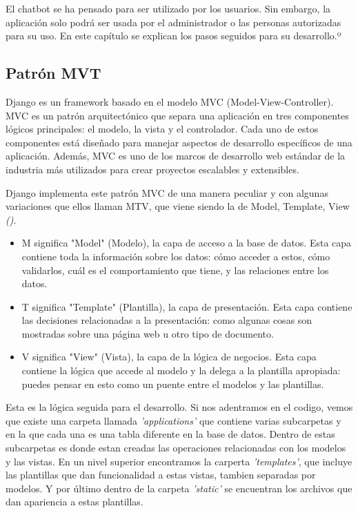 El chatbot se ha pensado para ser utilizado por los usuarios. Sin embargo, la aplicación solo podrá ser usada por el administrador o las personas autorizadas para su uso. En este capítulo se explican los pasos seguidos para su desarrollo.º

\subsection{Patrón MVT}

Django es un framework basado en el modelo  MVC (Model-View-Controller). MVC es un patrón arquitectónico que separa una aplicación en tres componentes lógicos principales: el modelo, la vista y el controlador. Cada uno de estos componentes está diseñado para manejar aspectos de desarrollo específicos de una aplicación. Además, MVC es uno de los marcos de desarrollo web estándar de la industria más utilizados para crear proyectos escalables y extensibles.

Django implementa este patrón MVC de una manera peculiar y con algunas variaciones que ellos llaman MTV, que viene siendo la de Model, Template, View \textit{(\cite{djangomvt})}.

\begin{itemize}

\item M significa "Model" (Modelo), la capa de acceso a la base de datos. Esta capa contiene toda la información sobre los datos: cómo acceder a estos, cómo validarlos, cuál es el comportamiento que tiene, y las relaciones entre los datos.

\item T significa "Template" (Plantilla), la capa de presentación. Esta capa contiene las decisiones relacionadas a la presentación: como algunas cosas son mostradas sobre una página web u otro tipo de documento.

\item V significa "View" (Vista), la capa de la lógica de negocios. Esta capa contiene la lógica que accede al modelo y la delega a la plantilla apropiada: puedes pensar en esto como un puente entre el modelos y las plantillas.

\end{itemize}

Esta es la lógica seguida para el desarrollo. Si nos adentramos en el codigo, vemos que existe una carpeta llamada \textit{'applications'} que contiene varias subcarpetas y en la que cada una es una tabla diferente en la base de datos. Dentro de estas subcarpetas es donde estan creadas las operaciones relacionadas con los modelos y las vistas. En un nivel superior encontramos la carperta \textit{'templates'}, que incluye las plantillas que dan funcionalidad a estas vistas, tambien separadas por modelos. Y por último dentro de la carpeta \textit{'static'} se encuentran los archivos que dan apariencia a estas plantillas.


